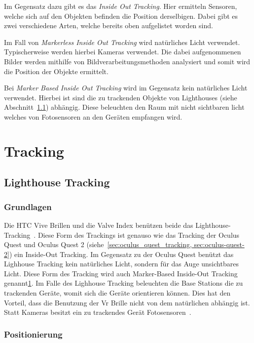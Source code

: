 Im Gegensatz dazu gibt es das \emph{Inside Out Tracking}.
Hier ermitteln Sensoren, welche sich auf den Objekten befinden die Position derselbigen.
Dabei gibt es zwei verschiedene Arten, welche bereits oben aufgelistet worden sind.

Im Fall von \emph{Markerless Inside Out Tracking} wird natürliches Licht verwendet.
Typischerweise werden hierbei Kameras verwendet.
Die dabei aufgenommenen Bilder werden mithilfe von Bildverarbeitungsmethoden analysiert und somit wird die Position der Objekte ermittelt.

Bei \emph{Marker Based Inside Out Tracking} wird im Gegensatz kein natürliches Licht verwendet.
Hierbei ist sind die zu trackenden Objekte von Lighthouses (siehe Abschnitt~\ref{sec:lighthouse_tracking}) abhängig.
Diese beleuchten den Raum mit nicht sichtbaren licht welches von Fotosensoren an den Geräten empfangen wird.

\section{Tracking}
\label{sec:tracking}

\subsection{Lighthouse Tracking}
\label{sec:lighthouse_tracking}

\subsubsection{Grundlagen}

Die HTC Vive Brillen und die Valve Index benützen beide das Lighthouse-Tracking~\cite{steam_lighhouse_versions}.
Diese Form des Trackings ist genauso wie das Tracking der Oculus Quest und Oculus Quest 2 (siehe~\ref{sec:oculus_quest_tracking, sec:oculus-quest-2}) ein Inside-Out Tracking.
Im Gegensatz zu der Oculus Quest benützt das Lighhouse Tracking kein natürliches Licht, sondern für das Auge unsichtbares Licht.
Diese Form des Tracking wird auch Marker-Based Inside-Out Tracking genannt\ref{sec:tracking}.
Im Falle des Lighhouse Tracking beleuchten die Base Stations die zu trackenden Geräte, womit sich die Geräte orientieren können.
Dies hat den Vorteil, dass die Benutzung der Vr Brille nicht von dem natürlichen abhängig ist.
Statt Kameras besitzt ein zu trackendes Gerät Fotosensoren~\cite{Buckley_2015}.

\subsubsection{Positionierung}

